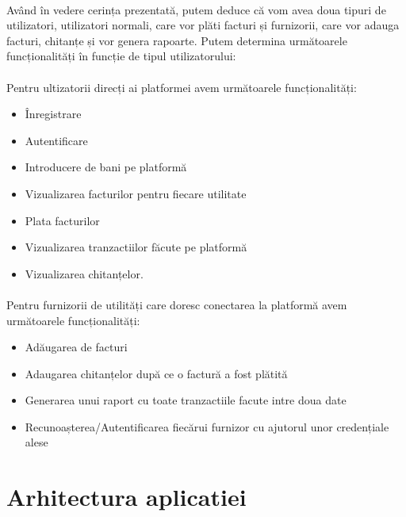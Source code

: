 \documentclass[12pt]{report}
\begin{document}
	\paragraph{}Având în vedere cerința prezentată, putem deduce că vom avea doua tipuri de utilizatori, utilizatori normali, care vor plăti facturi și furnizorii, care vor adauga facturi, chitanțe și vor genera rapoarte. Putem determina următoarele funcționalități în funcție de tipul utilizatorului:
	\paragraph{}Pentru ultizatorii direcți ai platformei avem următoarele funcționalități:
	\begin{itemize}
	\item Înregistrare
	\item Autentificare
	\item Introducere de bani pe platformă
	\item Vizualizarea facturilor pentru fiecare utilitate
	\item Plata facturilor
	\item Vizualizarea tranzactiilor făcute pe platformă
	\item Vizualizarea chitanțelor.
	\end{itemize}
	\paragraph{}Pentru furnizorii de utilități care doresc conectarea la platformă avem următoarele funcționalități:
	\begin{itemize}
	\item Adăugarea de facturi
	\item Adaugarea chitanțelor după ce o factură a fost plătită
	\item Generarea unui raport cu toate tranzactiile facute intre doua date
	\item Recunoașterea/Autentificarea fiecărui furnizor cu ajutorul unor credențiale alese
	\end{itemize}
	\section{Arhitectura aplicatiei}
\end{document}
